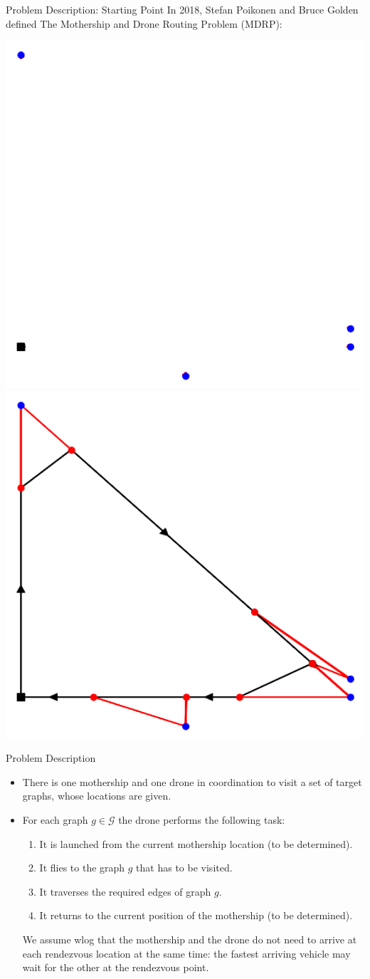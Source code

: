 \documentclass[slidestop,usepdftitle=false,10pt]{beamer}
\begin{document}
	\begin{frame}{Problem Description: Starting Point}
		In 2018, Stefan Poikonen and Bruce Golden defined The Mothership and Drone Routing 			Problem (MDRP):
		\begin{center}
			\includegraphics[width=0.37\linewidth]{poikonen_2}
			\includegraphics[width=0.37\linewidth]{poikonen_1}
		\end{center}
	\end{frame}
	
	\begin{frame}{Problem Description}
	\begin{itemize}
	    \item There is one mothership and one drone in coordination to visit a set of target graphs, whose locations are given.
	    \item For each graph $g\in\mathcal G$ the drone performs the following task:
	    \begin{enumerate}
	        \item It is launched from the current mothership location (to be determined).
	        \item It flies to the graph $g$ that has to be visited.
	        \item It traverses the required edges of graph $g$.
	        \item It returns to the current position of the mothership (to be determined).
	    \end{enumerate}
	    We assume wlog that the mothership and the drone do not need to arrive at each rendezvous location at the same time: the fastest arriving vehicle may wait for the other at the rendezvous point.
	\end{itemize}
	\end{frame}
	
\end{document}
